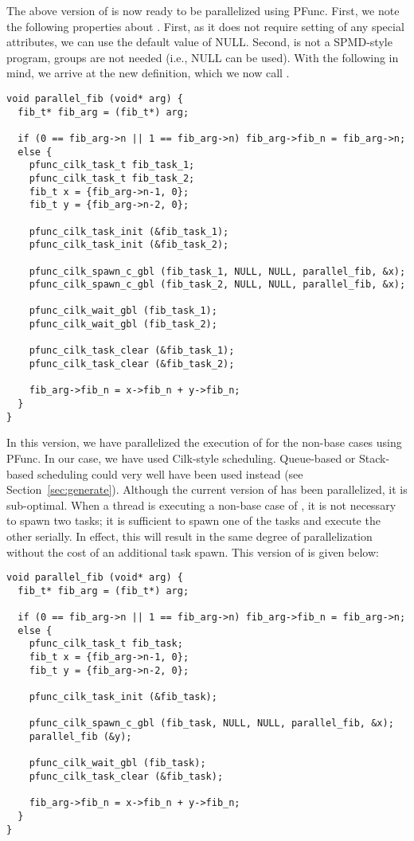 The above version of  is now ready to be parallelized using 
PFunc. First, we note the following properties about . First,
as it does not require setting of any special attributes, we can use the default
value of NULL. Second,  is not a SPMD-style program, groups
are not needed (i.e., NULL can be used). With the following in mind, we arrive
at the new definition, which we now call .

\pagebreak

\begin{lstlisting}
void parallel_fib (void* arg) {
  fib_t* fib_arg = (fib_t*) arg;

  if (0 == fib_arg->n || 1 == fib_arg->n) fib_arg->fib_n = fib_arg->n;
  else {
    pfunc_cilk_task_t fib_task_1;
    pfunc_cilk_task_t fib_task_2;
    fib_t x = {fib_arg->n-1, 0};
    fib_t y = {fib_arg->n-2, 0};

    pfunc_cilk_task_init (&fib_task_1);
    pfunc_cilk_task_init (&fib_task_2);

    pfunc_cilk_spawn_c_gbl (fib_task_1, NULL, NULL, parallel_fib, &x);
    pfunc_cilk_spawn_c_gbl (fib_task_2, NULL, NULL, parallel_fib, &x);

    pfunc_cilk_wait_gbl (fib_task_1);
    pfunc_cilk_wait_gbl (fib_task_2);

    pfunc_cilk_task_clear (&fib_task_1);
    pfunc_cilk_task_clear (&fib_task_2);

    fib_arg->fib_n = x->fib_n + y->fib_n;
  }
}
\end{lstlisting}

In this version, we have parallelized the execution of  for
the non-base cases using PFunc. In our case, we have used Cilk-style
scheduling.  Queue-based or Stack-based scheduling could very well have been
used instead (see Section~\ref{sec:generate}). Although the current version of
 has been parallelized, it is sub-optimal. When a thread is
executing a non-base case of , it is not necessary to spawn
two tasks; it is sufficient to spawn one of the tasks and execute the other
serially. In effect, this will result in the same degree of parallelization
without the cost of an additional task spawn. This version of
 is given below:

\begin{lstlisting}
void parallel_fib (void* arg) {
  fib_t* fib_arg = (fib_t*) arg;

  if (0 == fib_arg->n || 1 == fib_arg->n) fib_arg->fib_n = fib_arg->n;
  else {
    pfunc_cilk_task_t fib_task;
    fib_t x = {fib_arg->n-1, 0};
    fib_t y = {fib_arg->n-2, 0};

    pfunc_cilk_task_init (&fib_task);

    pfunc_cilk_spawn_c_gbl (fib_task, NULL, NULL, parallel_fib, &x);
    parallel_fib (&y);

    pfunc_cilk_wait_gbl (fib_task);
    pfunc_cilk_task_clear (&fib_task);

    fib_arg->fib_n = x->fib_n + y->fib_n;
  }
}
\end{lstlisting}

